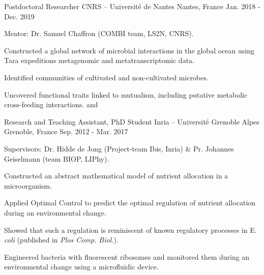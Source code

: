 

\begin{cventries}

  \cventry
    {Postdoctoral Researcher} %
    {CNRS -- Université de Nantes} %
    {Nantes, France} %
    {Jan. 2018 - Dec. 2019} %
    {
	Mentor: Dr. Samuel Chaffron (COMBI team, LS2N, CNRS).
    \vspace{0.5cm}
	\begin{cvitems} %
		\item {Constructed a global network of microbial interactions in the global ocean using Tara expeditions metagenomic and metatranscriptomic data.}
		\item {Identified communities of cultivated and non-cultivated microbes.}
		\item {Uncovered functional traits linked to mutualism, including putative metabolic cross-feeding interactions.}
		and 
	\end{cvitems}
    }
    
  \cventry
    {Research and Teaching Assistant, PhD Student} %
    {Inria -- Université Grenoble Alpes} %
    {Grenoble, France} %
    {Sep. 2012 - Mar. 2017} %
    {
	Supervisors: Dr. Hidde de Jong (Project-team Ibis, Inria) \& Pr. Johannes Geiselmann (team BIOP, LIPhy).
    \vspace{0.5cm}
	\begin{cvitems} %
        \item {Constructed an abstract mathematical model of nutrient allocation in a microorganism.}
        \item {Applied Optimal Control to predict the optimal regulation of nutrient allocation during an environmental change.}
        \item {Showed that such a regulation is reminiscent of known regulatory processes in E. \textit{coli} (published in \textit{Plos Comp. Biol.}).}
		\item {Engineered bacteria with fluorescent ribosomes and monitored them during an environmental change using a microfluidic device.}
	\end{cvitems}
    }
\end{cventries}    

